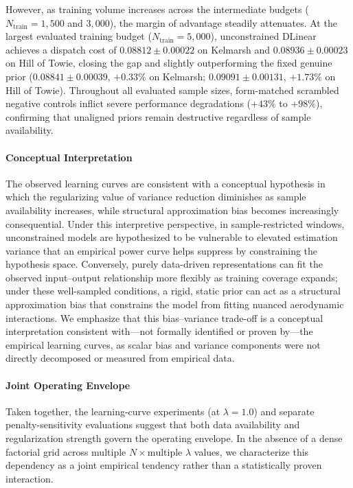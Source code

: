 However, as training volume increases across the intermediate budgets ($N_{\text{train}} = 1{,}500$ and $3{,}000$), the margin of advantage steadily attenuates. At the largest evaluated training budget ($N_{\text{train}} = 5{,}000$), unconstrained DLinear achieves a dispatch cost of $0.08812 \pm 0.00022$ on Kelmarsh and $0.08936 \pm 0.00023$ on Hill of Towie, closing the gap and slightly outperforming the fixed genuine prior ($0.08841 \pm 0.00039$, $+0.33\%$ on Kelmarsh; $0.09091 \pm 0.00131$, $+1.73\%$ on Hill of Towie). Throughout all evaluated sample sizes, form-matched scrambled negative controls inflict severe performance degradations ($+43\%$ to $+98\%$), confirming that unaligned priors remain destructive regardless of sample availability.

\paragraph{Conceptual Interpretation}
The observed learning curves are consistent with a conceptual hypothesis in which the regularizing value of variance reduction diminishes as sample availability increases, while structural approximation bias becomes increasingly consequential. Under this interpretive perspective, in sample-restricted windows, unconstrained models are hypothesized to be vulnerable to elevated estimation variance that an empirical power curve helps suppress by constraining the hypothesis space. Conversely, purely data-driven representations can fit the observed input--output relationship more flexibly as training coverage expands; under these well-sampled conditions, a rigid, static prior can act as a structural approximation bias that constrains the model from fitting nuanced aerodynamic interactions. We emphasize that this bias--variance trade-off is a conceptual interpretation consistent with---not formally identified or proven by---the empirical learning curves, as scalar bias and variance components were not directly decomposed or measured from empirical data.

\paragraph{Joint Operating Envelope}
Taken together, the learning-curve experiments (at $\lambda=1.0$) and separate penalty-sensitivity evaluations suggest that both data availability and regularization strength govern the operating envelope. In the absence of a dense factorial grid across multiple $N \times \text{multiple } \lambda$ values, we characterize this dependency as a joint empirical tendency rather than a statistically proven interaction.

